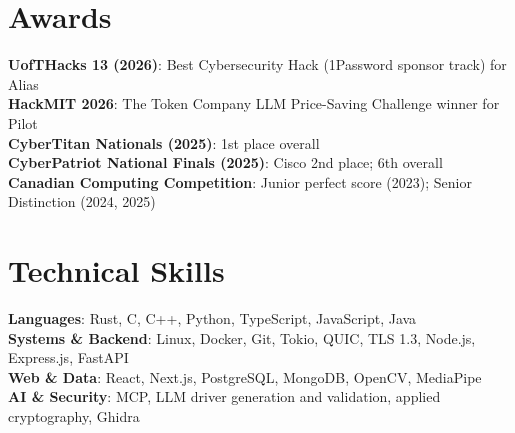 \documentclass[letterpaper,11pt]{article}
\begin{document}
\section{Awards}
{\small
\textbf{UofTHacks 13 (2026)}: Best Cybersecurity Hack (1Password sponsor track) for Alias\\
\textbf{HackMIT 2026}: The Token Company LLM Price-Saving Challenge winner for Pilot\\
\textbf{CyberTitan Nationals (2025)}: 1st place overall\\
\textbf{CyberPatriot National Finals (2025)}: Cisco 2nd place; 6th overall\\
\textbf{Canadian Computing Competition}: Junior perfect score (2023); Senior Distinction (2024, 2025)
}
\section{Technical Skills}
{\small
\textbf{Languages}: Rust, C, C++, Python, TypeScript, JavaScript, Java\\
\textbf{Systems \& Backend}: Linux, Docker, Git, Tokio, QUIC, TLS 1.3, Node.js, Express.js, FastAPI\\
\textbf{Web \& Data}: React, Next.js, PostgreSQL, MongoDB, OpenCV, MediaPipe\\
\textbf{AI \& Security}: MCP, LLM driver generation and validation, applied cryptography, Ghidra
}
\end{document}
